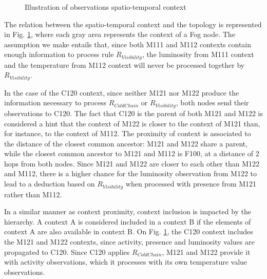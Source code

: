 \documentclass{iosart2c}
\begin{document}
\begin{figure}
	\centering
	\caption{Illustration of observations spatio-temporal context}
	\label{fig:contextuality}
	\scalebox{0.75}{
		
	}
\end{figure}

The relation between the spatio-temporal context and the topology is represented in Fig. \ref{fig:contextuality}, where each gray area represents the context of a Fog node.
The assumption we make entails that, since both M111 and M112 contexts contain enough information to process rule $R_{Visibility}$, the luminosity from M111 context and the temperature from M112 context will never be processed together by $R_{Visibility}$.

In the case of the C120 context, since neither M121 nor M122 produce the information necessary to process $R_{ColdChain}$ or $R_{Visibility}$, both nodes send their observations to C120.
The fact that C120 is the parent of both M121 and M122 is considered a hint that the context of M122 is closer to the context of M121 than, for instance, to the context of M112.
The proximity of context is associated to the distance of the closest common ancestor: M121 and M122 share a parent, while the closest common ancestor to M121 and M112 is F100, at a distance of 2 hops from both nodes.
Since M121 and M122 are closer to each other than M122 and M112, there is a higher chance for the luminosity observation from M122 to lead to a deduction based on $R_{Visibility}$ when processed with presence from M121 rather than M112.

In a similar manner as context proximity, context inclusion is impacted by the hierarchy.
A context A is considered included in a context B if the elements of context A are also available in context B.
On Fig. \ref{fig:contextuality}, the C120 context includes the M121 and M122 contexts, since activity, presence and luminosity values are propagated to C120.
Since C120 applies $R_{ColdChain}$, M121 and M122 provide it with activity observations, which it processes with its own temperature value observations.
\end{document}
